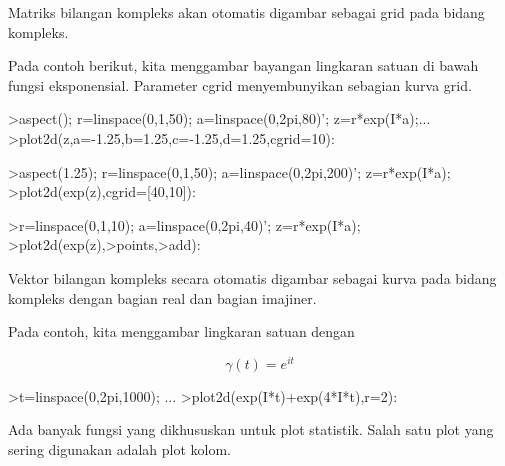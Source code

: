 \documentclass[a4paper,10pt]{article}
\begin{document}
\begin{eulernotebook}
\begin{eulercomment}
\begin{eulercomment}
\begin{eulercomment}
\begin{eulercomment}
\begin{eulercomment}
\begin{eulercomment}
\begin{eulercomment}
Matriks bilangan kompleks akan otomatis digambar sebagai grid pada bidang kompleks.

Pada contoh berikut, kita menggambar bayangan lingkaran satuan di bawah fungsi
eksponensial. Parameter cgrid menyembunyikan sebagian kurva grid.
\end{eulercomment}
\begin{eulerprompt}
>aspect(); r=linspace(0,1,50); a=linspace(0,2pi,80)'; z=r*exp(I*a);...
>plot2d(z,a=-1.25,b=1.25,c=-1.25,d=1.25,cgrid=10):
\end{eulerprompt}
\begin{eulerprompt}
>aspect(1.25); r=linspace(0,1,50); a=linspace(0,2pi,200)'; z=r*exp(I*a);
>plot2d(exp(z),cgrid=[40,10]):
\end{eulerprompt}
\begin{eulerprompt}
>r=linspace(0,1,10); a=linspace(0,2pi,40)'; z=r*exp(I*a);
>plot2d(exp(z),>points,>add):
\end{eulerprompt}
\begin{eulercomment}
Vektor bilangan kompleks secara otomatis digambar sebagai kurva pada bidang kompleks
dengan bagian real dan bagian imajiner.

Pada contoh, kita menggambar lingkaran satuan dengan

\end{eulercomment}
\begin{eulerformula}
\[
\gamma(t) = e^{it}
\]
\end{eulerformula}
\begin{eulerprompt}
>t=linspace(0,2pi,1000); ...
>plot2d(exp(I*t)+exp(4*I*t),r=2):
\end{eulerprompt}
\begin{eulercomment}
Ada banyak fungsi yang dikhususkan untuk plot statistik. Salah satu plot yang sering
digunakan adalah plot kolom.


\end{eulercomment}
\end{eulercomment}
\end{eulercomment}
\end{eulercomment}
\end{eulercomment}
\end{eulercomment}
\end{eulercomment}
\end{eulernotebook}
\end{document}
